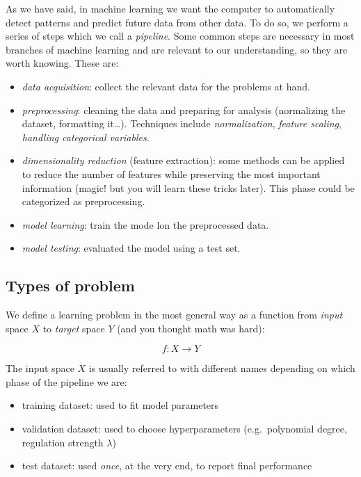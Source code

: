 \documentclass{article}
\begin{document}
As we have said, in machine learning we want the computer to
automatically detect patterns and predict future data from other data.
To do so, we perform a series of steps which we call a \emph{pipeline}.
Some common steps are necessary in most branches of machine learning and
are relevant to our understanding, so they are worth knowing. These are:

\begin{itemize}
\tightlist
\item
  \emph{data acquisition}: collect the relevant data for the problems at
  hand.
\item
  \emph{preprocessing}: cleaning the data and preparing for analysis
  (normalizing the dataset, formatting it\ldots). Techniques include
  \emph{normalization}, \emph{feature scaling}, \emph{handling
  categorical variables}.
\item
  \emph{dimensionality reduction} (feature extraction): some methods can
  be applied to reduce the number of features while preserving the most
  important information (magic! but you will learn these tricks later).
  This phase could be categorized as preprocessing.
\item
  \emph{model learning}: train the mode lon the preprocessed data.
\item
  \emph{model testing}: evaluated the model using a test set.
\end{itemize}

\subsection{Types of problem}\label{types-of-problem}

We define a learning problem in the most general way as a function from
\emph{input} space \(X\) to \emph{target} space \(Y\) (and you thought
math was hard):

\[f: X \rightarrow Y\]

The input space \(X\) is usually referred to with different names
depending on which phase of the pipeline we are:

\begin{itemize}
\tightlist
\item
  training dataset: used to fit model parameters
\item
  validation dataset: used to choose hyperparameters (e.g.~polynomial
  degree, regulation strength \(\lambda\))
\item
  test dataset: used \emph{once}, at the very end, to report final
  performance
\end{itemize}
\end{document}
